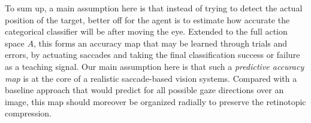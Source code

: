To sum up, a main assumption here is that instead of trying to detect the actual position of the target, better off for the agent is to estimate how accurate the categorical classifier will be after moving the eye. Extended to the full action space $A$, this forms an accuracy map that may be learned through trials and errors, by actuating saccades %
and taking the final classification success or failure as a teaching signal.
Our main assumption here is that such a \emph{predictive accuracy map} is at the core of a realistic saccade-based vision systems.
Compared with a baseline approach that would predict for all possible gaze directions over an image, this map should moreover be organized radially to preserve the retinotopic compression. 

